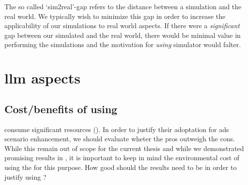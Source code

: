 The so called `sim2real'-gap refers to the distance between a simulation and the real world. We
typically wish to minimize this gap in order to increase the applicability of our simulations to
real world aspects. If there were a \emph{significant} gap between our simulated 
and the real world, there would be minimal value in performing the simulations and the motivation
for \emph{using} simulator would falter.







\section{\acrshort{llm} aspects}

\subsection{Cost/benefits of using }

 consume significant resources (). In order to justify their
adoptation for \acrshort{ads} scenario enhancement, we should evaluate wheter the pros outweigh the
cons. While this remain out of scope for the current thesis and while we demonstrated promising
results in , it is important to keep in mind the environmental cost of using the
 for this purpose. How good should the results need to be in order to justify using
?

